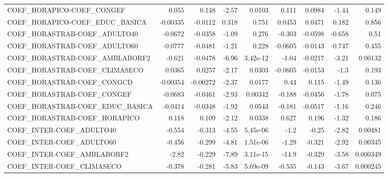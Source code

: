 \begin{tabular}{lrrrrrrrr}
COEF\_HORAPICO-COEF\_CONGEF             &       0.055 &        0.148 &    -2.57 &   0.0103 &      0.111 &      0.0984 &        -1.44 &         0.149 \\
COEF\_HORAPICO-COEF\_EDUC\_BASICA        &    -0.00335 &      -0.0112 &    0.318 &    0.751 &     0.0453 &      0.0471 &        0.182 &         0.856 \\
COEF\_HORASTRAB-COEF\_ADULTO40          &     -0.0672 &      -0.0358 &    -1.09 &    0.276 &     -0.303 &     -0.0598 &       -0.658 &          0.51 \\
COEF\_HORASTRAB-COEF\_ADULTO60          &     -0.0777 &      -0.0481 &    -1.21 &    0.228 &    -0.0605 &     -0.0143 &       -0.747 &         0.455 \\
COEF\_HORASTRAB-COEF\_AMBLABORF2        &      -0.621 &      -0.0478 &    -6.96 & 3.42e-12 &      -1.04 &     -0.0217 &        -3.21 &       0.00132 \\
COEF\_HORASTRAB-COEF\_CLIMASECO         &      0.0365 &       0.0257 &    -2.17 &   0.0303 &    -0.0605 &     -0.0153 &         -1.3 &         0.193 \\
COEF\_HORASTRAB-COEF\_CONGCD            &    -0.00354 &     -0.00272 &    -2.37 &   0.0177 &       0.44 &       0.115 &        -1.49 &         0.136 \\
COEF\_HORASTRAB-COEF\_CONGEF            &     -0.0683 &      -0.0461 &    -2.93 &  0.00342 &     -0.188 &     -0.0456 &        -1.78 &         0.075 \\
COEF\_HORASTRAB-COEF\_EDUC\_BASICA       &     -0.0414 &      -0.0348 &    -1.92 &   0.0543 &     -0.181 &     -0.0517 &        -1.16 &         0.246 \\
COEF\_HORASTRAB-COEF\_HORAPICO          &       0.118 &        0.109 &    -2.12 &   0.0338 &      0.627 &       0.196 &        -1.32 &         0.186 \\
COEF\_INTER-COEF\_ADULTO40              &      -0.554 &       -0.313 &    -4.55 & 5.45e-06 &       -1.2 &       -0.25 &        -2.82 &       0.00481 \\
COEF\_INTER-COEF\_ADULTO60              &      -0.456 &       -0.299 &    -4.81 & 1.51e-06 &      -1.29 &      -0.321 &        -2.92 &       0.00345 \\
COEF\_INTER-COEF\_AMBLABORF2            &       -2.82 &       -0.229 &    -7.89 & 3.11e-15 &      -14.9 &      -0.329 &        -3.58 &      0.000349 \\
COEF\_INTER-COEF\_CLIMASECO             &      -0.378 &       -0.281 &    -5.83 & 5.69e-09 &     -0.535 &      -0.143 &        -3.67 &      0.000245 \\

\end{tabular}
